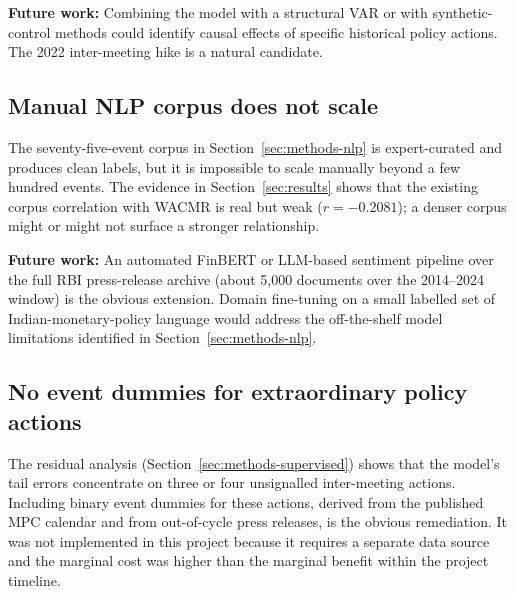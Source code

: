 \textbf{Future work:} Combining the model with a structural VAR or
with synthetic-control methods could identify causal effects of
specific historical policy actions. The 2022 inter-meeting hike is a
natural candidate.

\subsection{Manual NLP corpus does not scale}

The seventy-five-event corpus in Section~\ref{sec:methods-nlp} is
expert-curated and produces clean labels, but it is impossible to
scale manually beyond a few hundred events. The evidence in
Section~\ref{sec:results} shows that the existing corpus correlation
with WACMR is real but weak ($r=-0.2081$); a denser corpus might or
might not surface a stronger relationship.

\textbf{Future work:} An automated FinBERT or LLM-based sentiment
pipeline over the full RBI press-release archive (about 5,000
documents over the 2014--2024 window) is the obvious extension.
Domain fine-tuning on a small labelled set of Indian-monetary-policy
language would address the off-the-shelf model limitations identified
in Section~\ref{sec:methods-nlp}.

\subsection{No event dummies for extraordinary policy actions}

The residual analysis (Section~\ref{sec:methods-supervised}) shows
that the model's tail errors concentrate on three or four
unsignalled inter-meeting actions. Including binary event dummies
for these actions, derived from the published MPC calendar and from
out-of-cycle press releases, is the obvious remediation. It was not
implemented in this project because it requires a separate data
source and the marginal cost was higher than the marginal benefit
within the project timeline.
